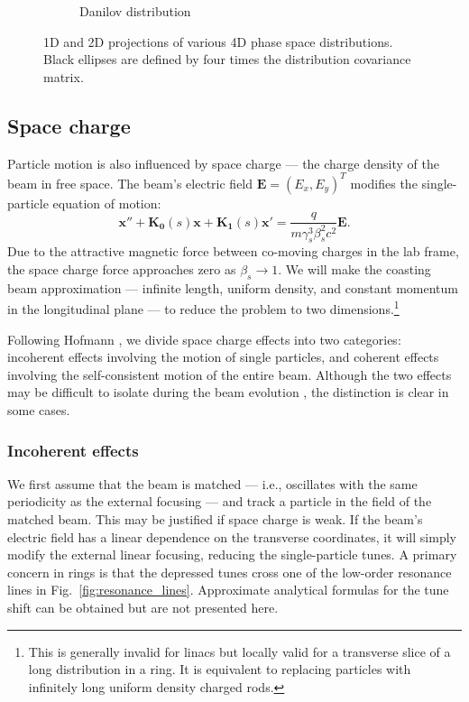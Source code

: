\begin{figure}[!p]
\begin{subfigure}{0.49\textwidth}
        \caption{Danilov distribution}
        \label{fig:distributions_danilov}
    \end{subfigure}
    \caption{1D and 2D projections of various 4D phase space distributions. Black ellipses are defined by four times the distribution covariance matrix.}
    \label{fig:distributions}
\end{figure}
%






\subsection{Space charge}\label{sec:Space charge}

Particle motion is also influenced by space charge — the charge density of the beam in free space. The beam's electric field $\mathbf{E} = (E_x, E_y)^T$ modifies the single-particle equation of motion:
%
\begin{equation}\label{eq:eom_with_spacecharge}
    \mathbf{x}'' + \mathbf{K_0}(s) \mathbf{x} + \mathbf{K_1}(s) \mathbf{x}' = \frac{q}{m\gamma_s^3\beta_s^2c^2} \mathbf{E}.
\end{equation}
% 
Due to the attractive magnetic force between co-moving charges in the lab frame, the space charge force approaches zero as $\beta_s \rightarrow 1$. We will make the coasting beam approximation — infinite length, uniform density, and constant momentum in the longitudinal plane — to reduce the problem to two dimensions.\footnote{This is generally invalid for linacs but locally valid for a transverse slice of a long distribution in a ring. It is equivalent to replacing particles with infinitely long uniform density charged rods.}

Following Hofmann \cite{Hofmann2017Book}, we divide space charge effects into two categories: incoherent effects involving the motion of single particles, and coherent effects involving the self-consistent motion of the entire beam. Although the two effects may be difficult to isolate during the beam evolution \cite{Hofmann2021}, the distinction is clear in some cases. 


\subsubsection{Incoherent effects}

We first assume that the beam is matched — i.e., oscillates with the same periodicity as the external focusing — and track a particle in the field of the matched beam. This may be justified if space charge is weak. If the beam's electric field has a linear dependence on the transverse coordinates, it will simply modify the external linear focusing, reducing the single-particle tunes. A primary concern in rings is that the depressed tunes cross one of the low-order resonance lines in Fig.~\ref{fig:resonance_lines}. Approximate analytical formulas for the tune shift can be obtained \cite{Ng2005} but are not presented here. 

